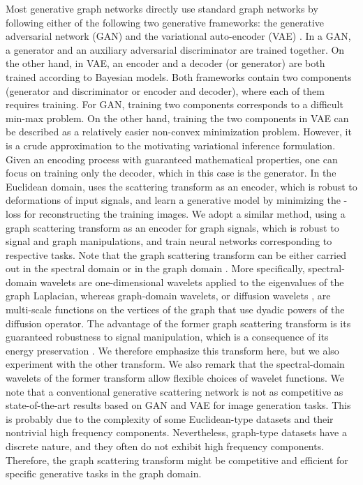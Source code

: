 \documentclass[conference]{IEEEtran}
\begin{document}
Most generative graph networks directly use standard graph networks by following either of the following two generative frameworks: the generative adversarial network (GAN) \cite{goodfellow2014generative} and the variational auto-encoder (VAE) \cite{kingma2013auto}. 
In a GAN, a generator and an auxiliary adversarial discriminator are trained together. On the other hand, in VAE, an encoder and a decoder (or generator) are both trained according to Bayesian models. Both frameworks contain two components (generator and discriminator or encoder and decoder), where each of them requires training. For GAN, training two components corresponds to a difficult min-max problem. On the other hand, training the two components in VAE can be described as a relatively easier non-convex minimization problem. However, it is a crude approximation to the motivating variational inference formulation.
Given an encoding process with guaranteed mathematical properties, one can focus on training only the decoder, which in this case is the generator.
In the Euclidean domain, \cite{angles2018generative} uses the scattering transform as an encoder, which is robust to deformations of input signals, and learn a generative model by minimizing the -loss for reconstructing the training images. We adopt a similar method, using a graph scattering transform as an encoder for graph signals, which is robust to signal and graph manipulations, and train neural networks corresponding to respective tasks. Note that the graph scattering transform can be either carried out in the spectral domain \cite{zou2018graph} or in the graph domain \cite{gama2018diffusion}. More specifically, spectral-domain wavelets \cite{hammond2011wavelets} are one-dimensional wavelets applied to the eigenvalues of the graph Laplacian, whereas graph-domain   wavelets, or diffusion wavelets \cite{coifman2006diffusion}, are multi-scale functions on the vertices of the graph that use dyadic powers of the diffusion operator. The advantage of the former graph scattering transform is its guaranteed robustness to signal manipulation, which is a consequence of its energy preservation \cite{zou2018graph}. We therefore emphasize this transform here, but we also experiment with the other transform. We also remark that the spectral-domain wavelets of the former transform allow flexible choices of wavelet functions. 
We note that a conventional generative scattering network \cite{angles2018generative} is not as competitive as state-of-the-art results based on GAN and VAE for image generation tasks. This is probably due to the complexity of some Euclidean-type datasets and their nontrivial high frequency components. Nevertheless, graph-type datasets have a discrete nature, and they often do not exhibit high frequency components. Therefore, the graph scattering transform might be competitive and efficient for specific generative tasks in the graph domain.
\end{document}
